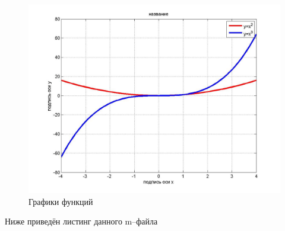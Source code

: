 \begin{figure}[!h]\center
\captionsetup{singlelinecheck=true}
\includegraphics*[scale=0.4]{./about/matlab/matlab_figure_002}
\caption{Графики функций} \label{matlab_figure_002}
\end{figure}

Ниже приведён листинг данного m--файла
\inputminted[fontsize=\small, linenos, breaklines, numbersep=2mm, xleftmargin=5mm]{matlab}{./about/matlab/mallab.m}




